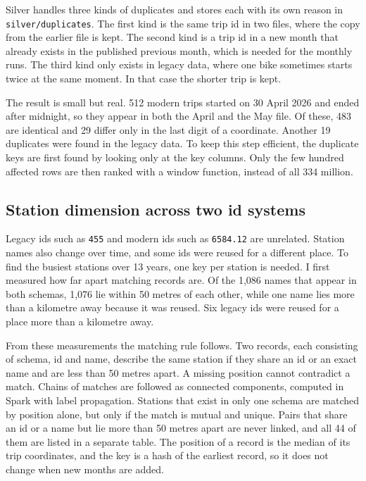 \documentclass[11pt,a4paper]{article}
\newcommand{\code}[1]{\texttt{\small #1}}
\begin{document}
Silver handles three kinds of duplicates and stores each with its own reason in \code{silver/duplicates}. The first kind is
the same trip id in two files, where the copy from the earlier file is kept. The second kind is a trip id in a new month
that already exists in the published previous month, which is needed for the monthly runs. The third kind only exists in
legacy data, where one bike sometimes starts twice at the same moment. In that case the shorter trip is kept.

The result is small but real. 512 modern trips started on 30 April 2026 and ended after midnight, so they appear in both the
April and the May file. Of these, 483 are identical and 29 differ only in the last digit of a coordinate. Another 19
duplicates were found in the legacy data. To keep this step efficient, the duplicate keys are first found by looking only
at the key columns. Only the few hundred affected rows are then ranked with a window function, instead of all 334 million.

\subsection{Station dimension across two id systems}

Legacy ids such as \code{455} and modern ids such as \code{6584.12} are unrelated. Station names also change over time, and
some ids were reused for a different place. To find the busiest stations over 13 years, one key per station is needed. I
first measured how far apart matching records are. Of the 1,086 names that appear in both schemas, 1,076 lie within 50
metres of each other, while one name lies more than a kilometre away because it was reused. Six legacy ids were reused for a
place more than a kilometre away.

From these measurements the matching rule follows. Two records, each consisting of schema, id and name, describe the same
station if they share an id or an exact name and are less than 50 metres apart. A missing position cannot contradict a
match. Chains of matches are followed as connected components, computed in Spark with label propagation. Stations that
exist in only one schema are matched by position alone, but only if the match is mutual and unique. Pairs that share an id
or a name but lie more than 50 metres apart are never linked, and all 44 of them are listed in a separate table. The
position of a record is the median of its trip coordinates, and the key is a hash of the earliest record, so it does not
change when new months are added.
\end{document}
